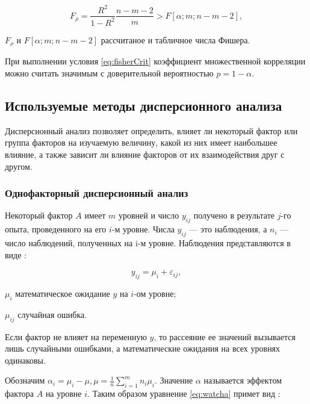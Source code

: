 \begin{equation}
\label{eq:fisherCrit}
F_\rho = \frac{R^2}{1-R^2} \frac{n - m - 2}{m} > F\left[{\alpha;m;n-m-2}\right],
\end{equation}
\begin{eqexpl}[60mm]
\item{$F_\rho$ и $F\left[\alpha;m;n-m-2\right]$} рассчитаное и табличное числа Фишера.
\end{eqexpl}

При выполнении условия \eqref{eq:fisherCrit} коэффициент множественной корреляции можно считать значимым с доверительной вероятностью $p = 1 - \alpha$.

\subsection{Используемые методы дисперсионного анализа}

Дисперсионный анализ позволяет определить, влияет ли некоторый фактор или группа факторов на изучаемую величину, какой из них имеет наибольшее влияние, а также зависит ли влияние факторов от их взаимодействия друг с другом. \cite{disperMethod}

\subsubsection{Однофакторный дисперсионный анализ}
Некоторый фактор $A$ имеет $m$ уровней и число $y_{ij}$ получено в результате $j$-го опыта, проведенного на его $i$-м уровне. Числа $y_{ij}$ --- это наблюдения, а $n_i$ --- число наблюдений, полученных на i-м уровне. Наблюдения представляются в виде \cite{disperMethod}:

\begin{equation}
\label{eq:watcha}
y_{ij} = \mu_i+\varepsilon_{ij},
\end{equation}
\begin{eqexpl}[15mm]
\item{$\mu_i$} математическое ожидание $y$ на $i$-ом уровне;
\item{$\mu_{ij}$} случайная ошибка.
\end{eqexpl}

Если фактор не влияет на переменную $y$, то рассеяние ее значений вызывается лишь случайными ошибками, а математические ожидания на всех уровнях одинаковы. \cite{disperMethod}

Обозначим $\alpha_i=\mu_i-\mu, \mu=\frac{1}{n}\sum_{i=1}^{m}{n_i\mu_i}$. Значение $\alpha$ называется эффектом фактора $A$ на уровне $i$. Таким образом уравнение \eqref{eq:watcha} примет вид \cite{disperMethod}:

